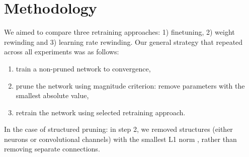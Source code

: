 

\section{Methodology}


We aimed to compare three retraining approaches: 1) finetuning, 2) weight rewinding and 3) learning rate rewinding. Our general strategy that repeated across all experiments was as follows:
\begin{enumerate}
    \item train a non-pruned network to convergence,
    \item prune the network using magnitude criterion: remove parameters with the smallest absolute value,
    \item retrain the network using selected retraining approach.
\end{enumerate}

In the case of structured pruning: in step 2, we removed structures (either neurons or convolutional channels) with the smallest L1 norm \cite{structured}, rather than removing separate connections. 

